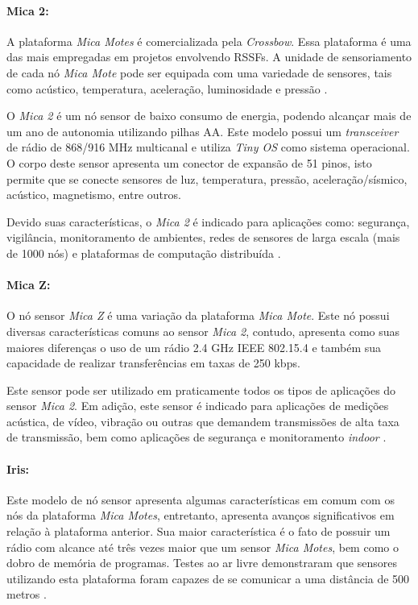 \paragraph{Mica 2:}
A plataforma \emph{Mica Motes} é comercializada pela \emph{Crossbow}. Essa plataforma é uma das mais empregadas em projetos envolvendo RSSFs. A unidade de sensoriamento de cada nó \emph{Mica Mote} pode ser equipada com uma variedade de sensores, tais como acústico, temperatura, aceleração, luminosidade e pressão \cite{Ruiz2004}.

O \emph{Mica 2} é um nó sensor de baixo consumo de energia, podendo alcançar mais de um ano de autonomia utilizando pilhas AA. Este modelo possui um \emph{transceiver} de rádio de 868/916 MHz multicanal e utiliza \emph{Tiny OS} como sistema operacional.
O corpo deste sensor apresenta um conector de expansão de 51 pinos, isto permite que se conecte sensores de luz, temperatura, pressão, aceleração/sísmico, acústico, magnetismo, entre outros.

Devido suas características, o \emph{Mica 2} é indicado para aplicações como: segurança, vigilância, monitoramento de ambientes, redes de sensores de larga escala (mais de 1000 nós) e plataformas de computação distribuída \cite{Mica2}.

\paragraph{Mica Z:}
O nó sensor \emph{Mica Z} é uma variação da plataforma \emph{Mica Mote}. Este nó possui diversas características comuns ao sensor \emph{Mica 2}, contudo, apresenta como suas maiores diferenças o uso de um rádio 2.4 GHz IEEE 802.15.4 e também sua capacidade de realizar transferências em taxas de 250 kbps.

Este sensor pode ser utilizado em praticamente todos os tipos de aplicações do sensor \emph{Mica 2}. Em adição, este sensor é indicado para aplicações de medições acústica, de vídeo, vibração ou outras que demandem transmissões de alta taxa de transmissão, bem como aplicações de segurança e monitoramento \emph{indoor} \cite{MicaZ}.

\paragraph{Iris:}
Este modelo de nó sensor apresenta algumas características em comum com os nós da plataforma \emph{Mica Motes}, entretanto, apresenta avanços significativos em relação à plataforma anterior. Sua maior característica é o fato de possuir um rádio com alcance até três vezes maior que um sensor \emph{Mica Motes}, bem como o dobro de memória de programas.
Testes ao ar livre demonstraram que sensores utilizando esta plataforma foram capazes de se comunicar a uma distância de 500 metros \cite{Iris}.

